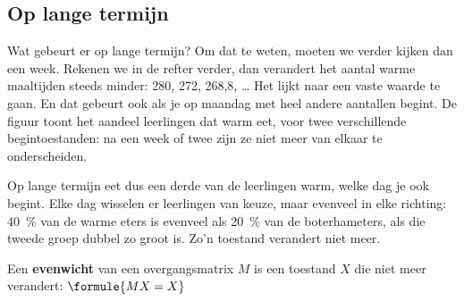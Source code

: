 \begin{oefeningen}
\end{oefeningen}

\subsection{Op lange termijn}

Wat gebeurt er op lange termijn? Om dat te weten, moeten we verder kijken dan een week. Rekenen we in de refter verder, dan verandert het aantal warme maaltijden steeds minder: 280, 272, 268,8, \ldots{} Het lijkt naar een vaste waarde te gaan. En dat gebeurt ook als je op maandag met heel andere aantallen begint. De figuur toont het aandeel leerlingen dat warm eet, voor twee verschillende begintoestanden: na een week of twee zijn ze niet meer van elkaar te onderscheiden.


Op lange termijn eet dus een derde van de leerlingen warm, welke dag je ook begint. Elke dag wisselen er leerlingen van keuze, maar evenveel in elke richting: 40~\% van de warme eters is evenveel als 20~\% van de boterhameters, als die tweede groep dubbel zo groot is. Zo'n toestand verandert niet meer.

\begin{theorie}
Een \textbf{\textcolor{accent}{evenwicht}} van een overgangsmatrix $M$ is een toestand $X$ die niet meer verandert: \quad $\formule{MX = X}$
\end{theorie}

